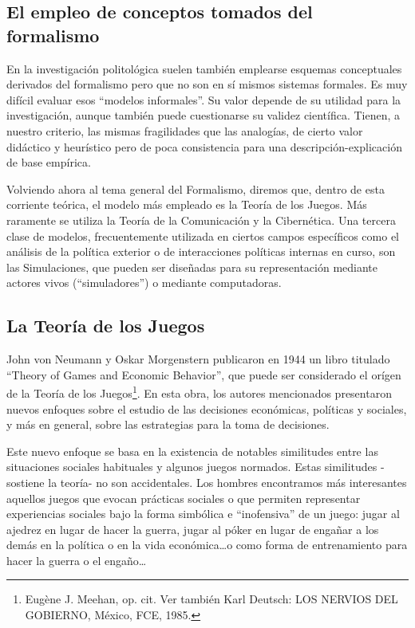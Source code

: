 \documentclass[
]{book}
\begin{document}
\hypertarget{el-empleo-de-conceptos-tomados-del-formalismo}{%
\subsection*{El empleo de conceptos tomados del formalismo}\label{el-empleo-de-conceptos-tomados-del-formalismo}}

En la investigación politológica suelen también emplearse esquemas conceptuales derivados del formalismo pero que no son en sí mismos sistemas formales. Es muy difícil evaluar esos ``modelos informales''. Su valor depende de su utilidad para la investigación, aunque también puede cuestionarse su validez científica. Tienen, a nuestro criterio, las mismas fragilidades que las analogías, de cierto valor didáctico y heurístico pero de poca consistencia para una descripción-explicación de base empírica.

Volviendo ahora al tema general del Formalismo, diremos que, dentro de esta corriente teórica, el modelo más empleado es la Teoría de los Juegos. Más raramente se utiliza la Teoría de la Comunicación y la Cibernética. Una tercera clase de modelos, frecuentemente utilizada en ciertos campos específicos como el análisis de la política exterior o de interacciones políticas internas en curso, son las Simulaciones, que pueden ser diseñadas para su representación mediante actores vivos (``simuladores'') o mediante computadoras.

\hypertarget{la-teoruxeda-de-los-juegos}{%
\subsection*{La Teoría de los Juegos}\label{la-teoruxeda-de-los-juegos}}

John von Neumann y Oskar Morgenstern publicaron en 1944 un libro titulado ``Theory of Games and Economic Behavior'', que puede ser considerado el orígen de la Teoría de los Juegos\footnote{Eugène J. Meehan, op. cit. Ver también Karl Deutsch: LOS NERVIOS DEL GOBIERNO, México, FCE, 1985.}. En esta obra, los autores mencionados presentaron nuevos enfoques sobre el estudio de las decisiones económicas, políticas y sociales, y más en general, sobre las estrategias para la toma de decisiones.

Este nuevo enfoque se basa en la existencia de notables similitudes entre las situaciones sociales habituales y algunos juegos normados. Estas similitudes -sostiene la teoría- no son accidentales. Los hombres encontramos más interesantes aquellos juegos que evocan prácticas sociales o que permiten representar experiencias sociales bajo la forma simbólica e ``inofensiva'' de un juego: jugar al ajedrez en lugar de hacer la guerra, jugar al póker en lugar de engañar a los demás en la política o en la vida económica\ldots o como forma de entrenamiento para hacer la guerra o el engaño\ldots{}
\end{document}
